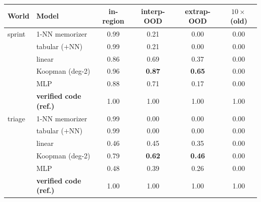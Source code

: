 \begin{tabular}{llcccc}
\toprule
World & Model & in-region & interp-OOD & extrap-OOD & $10\times$ (old) \\
\midrule
sprint & 1-NN memorizer & 0.99 & 0.21 & 0.00 & 0.00 \\
 & tabular ($+$NN) & 0.99 & 0.21 & 0.00 & 0.00 \\
 & linear & 0.86 & 0.69 & 0.37 & 0.00 \\
 & Koopman (deg-2) & 0.96 & \textbf{0.87} & \textbf{0.65} & 0.00 \\
 & MLP & 0.88 & 0.71 & 0.17 & 0.00 \\
 & \textbf{verified code (ref.)} & 1.00 & 1.00 & 1.00 & 1.00 \\
\midrule
triage & 1-NN memorizer & 0.99 & 0.00 & 0.00 & 0.00 \\
 & tabular ($+$NN) & 0.99 & 0.00 & 0.00 & 0.00 \\
 & linear & 0.46 & 0.45 & 0.35 & 0.00 \\
 & Koopman (deg-2) & 0.79 & \textbf{0.62} & \textbf{0.46} & 0.00 \\
 & MLP & 0.48 & 0.39 & 0.26 & 0.00 \\
 & \textbf{verified code (ref.)} & 1.00 & 1.00 & 1.00 & 1.00 \\
\bottomrule
\end{tabular}
